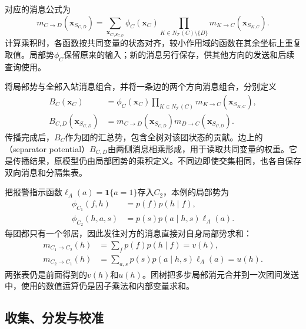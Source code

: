 对应的消息公式为
\begin{equation}
  m_{C\to D}(\bm{x}_{S_{C,D}})
    =\sum_{\bm{x}_{C\setminus S_{C,D}}}
      \phi_C(\bm{x}_C)
      \prod_{K\in N_{\mathcal{T}}(C)\setminus\{D\}}
        m_{K\to C}(\bm{x}_{S_{K,C}}).
  \label{eq:pgm-junction-tree-clique-message}
\end{equation}
计算乘积时，各函数按共同变量的状态对齐，较小作用域的函数在其余坐标上重复取值。局部势$\phi_C$保留原来的输入；新的消息另行保存，供其他方向的发送和后续查询使用。

将局部势与全部入站消息组合，并将一条边的两个方向消息组合，分别定义
\begin{equation}
  \begin{aligned}
    B_C(\bm{x}_C)
      &=\phi_C(\bm{x}_C)
        \prod_{K\in N_{\mathcal{T}}(C)}
          m_{K\to C}(\bm{x}_{S_{K,C}}),\\
    B_{C,D}(\bm{x}_{S_{C,D}})
      &=m_{C\to D}(\bm{x}_{S_{C,D}})
        m_{D\to C}(\bm{x}_{S_{C,D}}).
  \end{aligned}
  \label{eq:pgm-junction-tree-clique-separator-beliefs}
\end{equation}
传播完成后，$B_C$作为团的汇总势，包含全树对该团状态的贡献。边上的（separator potential）$B_{C,D}$由两侧消息相乘形成，用于读取共同变量的权重。它是传播结果，原模型仍由局部团势的乘积定义。不同边即使交集相同，也各自保存双向消息和分隔集表。

把报警指示函数$\ell_A(a)=\mathbf{1}\{a=1\}$存入$C_2$，本例的局部势为
\[
  \begin{aligned}
    \phi_{C_1}(f,h)&=p(f)p(h\mid f),\\
    \phi_{C_2}(h,a,s)&=p(s)p(a\mid h,s)\ell_A(a).
  \end{aligned}
\]
每团都只有一个邻居，因此发往对方的消息直接对自身局部势求和：
\begin{equation}
  \begin{aligned}
    m_{C_1\to C_2}(h)&=\sum_f p(f)p(h\mid f)=v(h),\\
    m_{C_2\to C_1}(h)&=\sum_{a,s}p(s)p(a\mid h,s)\ell_A(a)=u(h).
  \end{aligned}
  \label{eq:pgm-junction-tree-device-clique-messages}
\end{equation}
两张表仍是前面得到的$v(h)$和$u(h)$。团树把多步局部消元合并到一次团间发送中，使用的数值运算仍是因子乘法和内部变量求和。

\subsection{收集、分发与校准}
\label{sec:pgm-junction-tree-calibration}

